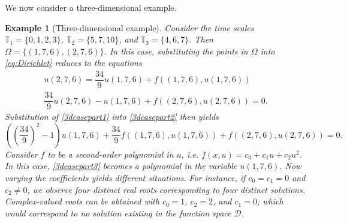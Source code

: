 \documentclass{article}
\newtheorem{example}[theorem]{Example}
\numberwithin{equation}{section}
\numberwithin{theorem}{section}
\begin{document}
We now consider a three-dimensional example.
\begin{example}[Three-dimensional example]\label{ex:3D}
Consider the time scales $\mathbb{T}_1=\{0,1,2,3\}$, $\mathbb{T}_2=\{5,7,10\}$, and $\mathbb{T}_3=\{4,6,7\}$. Then $\Omega=\{(1,7,6), (2,7,6)\}$. In this case, substituting the points in $\Omega$ into \eqref{eq:Dirichlet} reduces to the equations
\begin{align} 
u(2,7,6)=\dfrac{34}{9}u(1,7,6)+f((1,7,6),u(1,7,6)) \label{3dcasepart1} \\
\dfrac{34}{9}u(2,7,6) - u(1,7,6) + f((2,7,6),u(2,7,6))=0.\label{3dcasepart2}
\end{align}
Substitution of \eqref{3dcasepart1} into \eqref{3dcasepart2} then yields
\begin{equation} \label{3dcasepart3}
\left(\left(\dfrac{34}{9}\right)^2-1\right) u(1,7,6) + \dfrac{34}{9}f((1,7,6),u(1,7,6)) + f((2,7,6),u(2,7,6))=0.
\end{equation}
Consider $f$ to be a second-order polynomial in $u$, i.e. $f(x,u)=c_0+c_1u+c_2u^2$. In this case, \eqref{3dcasepart3} becomes a polynomial in the variable $u(1,7,6)$. Now varying the coefficients yields different situations. For instance, if $c_0=c_1=0$ and $c_2\neq 0$, we observe four distinct real roots corresponding to four distinct solutions. Complex-valued roots can be obtained with $c_0=1$, $c_2=2$, and $c_1=0$; which would correspond to no solution existing in the function space $\mathscr{D}$.
\end{example} 
\end{document}

